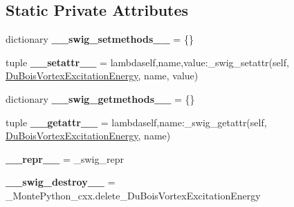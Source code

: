 \subsection*{Static Private Attributes}
\begin{DoxyCompactItemize}
\item 
\hypertarget{classMontePython__cxx_1_1DuBoisVortexExcitationEnergy_abed192bab3bd2b9345319225c3a7468b}{}dictionary {\bfseries \+\_\+\+\_\+swig\+\_\+setmethods\+\_\+\+\_\+} = \{\}\label{classMontePython__cxx_1_1DuBoisVortexExcitationEnergy_abed192bab3bd2b9345319225c3a7468b}

\item 
\hypertarget{classMontePython__cxx_1_1DuBoisVortexExcitationEnergy_a61b6a66ee7109173f31a611efa78af9d}{}tuple {\bfseries \+\_\+\+\_\+setattr\+\_\+\+\_\+} = lambdaself,name,value\+:\+\_\+swig\+\_\+setattr(self, \hyperlink{classMontePython__cxx_1_1DuBoisVortexExcitationEnergy}{Du\+Bois\+Vortex\+Excitation\+Energy}, name, value)\label{classMontePython__cxx_1_1DuBoisVortexExcitationEnergy_a61b6a66ee7109173f31a611efa78af9d}

\item 
\hypertarget{classMontePython__cxx_1_1DuBoisVortexExcitationEnergy_aed6bc35f821f78ebdebc558d0d5d47a8}{}dictionary {\bfseries \+\_\+\+\_\+swig\+\_\+getmethods\+\_\+\+\_\+} = \{\}\label{classMontePython__cxx_1_1DuBoisVortexExcitationEnergy_aed6bc35f821f78ebdebc558d0d5d47a8}

\item 
\hypertarget{classMontePython__cxx_1_1DuBoisVortexExcitationEnergy_a20f18564b2f2b2e2a17f24275ce4ffa6}{}tuple {\bfseries \+\_\+\+\_\+getattr\+\_\+\+\_\+} = lambdaself,name\+:\+\_\+swig\+\_\+getattr(self, \hyperlink{classMontePython__cxx_1_1DuBoisVortexExcitationEnergy}{Du\+Bois\+Vortex\+Excitation\+Energy}, name)\label{classMontePython__cxx_1_1DuBoisVortexExcitationEnergy_a20f18564b2f2b2e2a17f24275ce4ffa6}

\item 
\hypertarget{classMontePython__cxx_1_1DuBoisVortexExcitationEnergy_a323733b48132e7921b272eada09a6695}{}{\bfseries \+\_\+\+\_\+repr\+\_\+\+\_\+} = \+\_\+swig\+\_\+repr\label{classMontePython__cxx_1_1DuBoisVortexExcitationEnergy_a323733b48132e7921b272eada09a6695}

\item 
\hypertarget{classMontePython__cxx_1_1DuBoisVortexExcitationEnergy_a469f0a35a04fa57db76d4ae194b16168}{}{\bfseries \+\_\+\+\_\+swig\+\_\+destroy\+\_\+\+\_\+} = \+\_\+\+Monte\+Python\+\_\+cxx.\+delete\+\_\+\+Du\+Bois\+Vortex\+Excitation\+Energy\label{classMontePython__cxx_1_1DuBoisVortexExcitationEnergy_a469f0a35a04fa57db76d4ae194b16168}

\end{DoxyCompactItemize}


